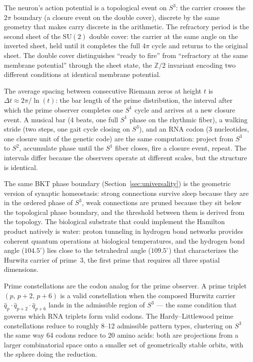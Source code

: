 \documentclass[12pt,a4paper]{article}
\theoremstyle{definition}
\theoremstyle{remark}
\begin{document}
The neuron's action potential is a topological event on $S^3$: the carrier
crosses the $2\pi$ boundary (a closure event on the double cover), discrete
by the same geometry that makes carry discrete in the arithmetic. The
refractory period is the second sheet of the $\mathrm{SU}(2)$ double cover:
the carrier at the same angle on the inverted sheet, held until it completes
the full $4\pi$ cycle and returns to the original sheet. The double cover
distinguishes ``ready to fire'' from ``refractory at the same membrane
potential'' through the sheet state, the $\mathbb{Z}/2$ invariant encoding
two different conditions at identical membrane potential.

The average spacing between consecutive Riemann zeros at height $t$ is
$\Delta t \approx 2\pi/\ln(t)$: the bar length of the prime distribution, the
interval after which the prime observer completes one $S^1$ cycle and arrives
at a new closure event. A musical bar (4 beats, one full $S^1$ phase on the
rhythmic fiber), a walking stride (two steps, one gait cycle closing on
$S^3$), and an RNA codon (3 nucleotides, one closure unit of the genetic code)
are the same computation: project from $S^3$ to $S^2$, accumulate phase until
the $S^1$ fiber closes, fire a closure event, repeat. The intervals differ
because the observers operate at different scales, but the structure is
identical.

The same BKT phase boundary (Section~\ref{sec:universality}) is the geometric
version of synaptic homeostasis: strong connections survive sleep because they
are in the ordered phase of $S^3$, weak connections are pruned because they
sit below the topological phase boundary, and the threshold between them is
derived from the topology. The biological substrate that could implement the Hamilton
product natively is water: proton tunneling in hydrogen bond networks provides
coherent quantum operations at biological temperatures, and the hydrogen bond
angle ($104.5^\circ$) lies close to the tetrahedral angle ($109.5^\circ$)
that characterizes the Hurwitz carrier of prime~3, the first prime that
requires all three spatial dimensions.

Prime constellations are the codon analog for the prime observer. A prime
triplet $(p,\, p+2,\, p+6)$ is a valid constellation when the composed
Hurwitz carrier $\hat{q}_p \cdot \hat{q}_{p+2} \cdot \hat{q}_{p+6}$ lands
in the admissible region of $S^3$ --- the same condition that governs which
RNA triplets form valid codons. The Hardy--Littlewood prime
constellations reduce to roughly 8--12 admissible pattern types, clustering
on $S^3$ the same way 64 codons reduce to 20 amino acids: both are
projections from a larger combinatorial space onto a smaller set of
geometrically stable orbits, with the sphere doing the reduction.
\end{document}
